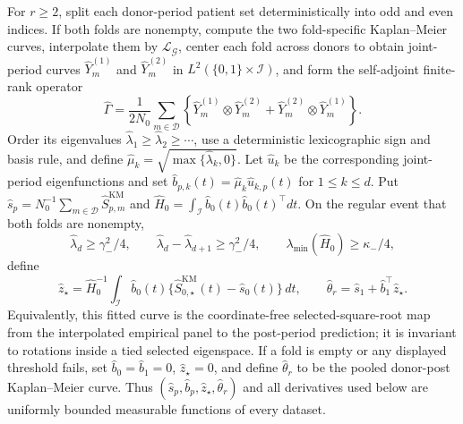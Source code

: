For \(r\ge2\), split each donor-period patient set deterministically into odd and even indices. If both folds are nonempty, compute the two fold-specific Kaplan--Meier curves, interpolate them by \(\mathcal L_{\mathcal G}\), center each fold across donors to obtain joint-period curves \(\widehat Y_m^{(1)}\) and \(\widehat Y_m^{(2)}\) in \(L^2(\{0,1\}\times\mathcal I)\), and form the self-adjoint finite-rank operator
\[
 \widehat\Gamma=\frac{1}{2N_0}\sum_{m\in\mathcal D}
 \left\{\widehat Y_m^{(1)}\otimes\widehat Y_m^{(2)}+
 \widehat Y_m^{(2)}\otimes\widehat Y_m^{(1)}\right\}.
\]
Order its eigenvalues \(\widehat\lambda_1\ge\widehat\lambda_2\ge\cdots\), use a deterministic lexicographic sign and basis rule, and define \(\widehat\mu_k=\sqrt{\max\{\widehat\lambda_k,0\}}\). Let \(\widehat u_k\) be the corresponding joint-period eigenfunctions and set \(\widehat b_{p,k}(t)=\widehat\mu_k\widehat u_{k,p}(t)\) for \(1\le k\le d\). Put \(\widehat s_p=N_0^{-1}\sum_{m\in\mathcal D}\widehat S^{\mathrm{KM}}_{p,m}\) and \(\widehat H_0=\int_{\mathcal I}\widehat b_0(t)\widehat b_0(t)^\top dt\). On the regular event that both folds are nonempty,
\[
 \widehat\lambda_d\ge\gamma_-^2/4,
 \qquad
 \widehat\lambda_d-\widehat\lambda_{d+1}\ge\gamma_-^2/4,
 \qquad
 \lambda_{\min}(\widehat H_0)\ge\kappa_-/4,
\]
define
\[
 \widehat z_\star=\widehat H_0^{-1}\int_{\mathcal I}\widehat b_0(t)
 \{\widehat S^{\mathrm{KM}}_{0,\star}(t)-\widehat s_0(t)\}\,dt,
 \qquad
 \widehat\theta_r=\widehat s_1+\widehat b_1^\top\widehat z_\star.
\]
Equivalently, this fitted curve is the coordinate-free selected-square-root map from the interpolated empirical panel to the post-period prediction; it is invariant to rotations inside a tied selected eigenspace. If a fold is empty or any displayed threshold fails, set \(\widehat b_0=\widehat b_1=0\), \(\widehat z_\star=0\), and define \(\widehat\theta_r\) to be the pooled donor-post Kaplan--Meier curve. Thus \((\widehat s_p,\widehat b_p,\widehat z_\star,\widehat\theta_r)\) and all derivatives used below are uniformly bounded measurable functions of every dataset.

